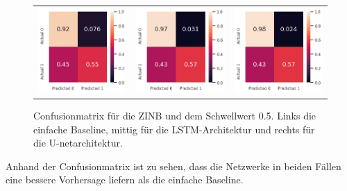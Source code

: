 \begin{figure}[h]
\begin{tabular}{ccc}
\includegraphics[width=45mm]{abb/simpleBaseLine.png}&
\includegraphics[width=45mm]{abb/znBinomConfusion_LSTM.png}&
\includegraphics[width=45mm]{abb/znBinomConfusion_UNET.png}
\end{tabular}
\caption{Confusionmatrix für die ZINB und dem Schwellwert 0.5. Links die einfache Baseline, mittig für die LSTM-Architektur und rechts für die U-netarchitektur. \label{fig:confusionmatrix_binom}}
\end{figure}

\noindent Anhand der Confusionmatrix ist zu sehen, dass die Netzwerke in beiden Fällen eine bessere Vorhersage liefern als die einfache Baseline.

